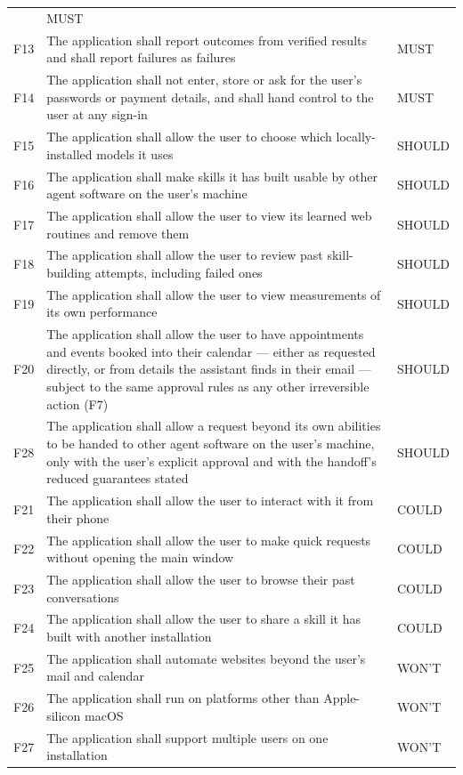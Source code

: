 \documentclass[12pt]{article}
\begin{document}
\begin{longtable}{@{}l R{11.3cm} l@{}}
    & MUST \\
  F13 & The application shall report outcomes from verified results and shall
    report failures as failures & MUST \\
  F14 & The application shall not enter, store or ask for the user's
    passwords or payment details, and shall hand control to the user at any
    sign-in & MUST \\
  F15 & The application shall allow the user to choose which
    locally-installed models it uses & SHOULD \\
  F16 & The application shall make skills it has built usable by other agent
    software on the user's machine & SHOULD \\
  F17 & The application shall allow the user to view its learned web routines
    and remove them & SHOULD \\
  F18 & The application shall allow the user to review past skill-building
    attempts, including failed ones & SHOULD \\
  F19 & The application shall allow the user to view measurements of its own
    performance & SHOULD \\
  F20 & The application shall allow the user to have appointments and events
    booked into their calendar --- either as requested directly, or from
    details the assistant finds in their email --- subject to the same
    approval rules as any other irreversible action (F7) & SHOULD \\
F28 & The application shall allow a request beyond its own abilities to be handed to other agent software on the user's machine, only with the user's explicit approval and with the handoff's reduced guarantees stated & SHOULD \\
  F21 & The application shall allow the user to interact with it from their
    phone & COULD \\
  F22 & The application shall allow the user to make quick requests without
    opening the main window & COULD \\
  F23 & The application shall allow the user to browse their past
    conversations & COULD \\
  F24 & The application shall allow the user to share a skill it has built
    with another installation & COULD \\
  F25 & The application shall automate websites beyond the user's mail and
    calendar & WON'T \\
  F26 & The application shall run on platforms other than Apple-silicon macOS
    & WON'T \\
  F27 & The application shall support multiple users on one installation
    & WON'T \\
\end{longtable}
\end{document}
